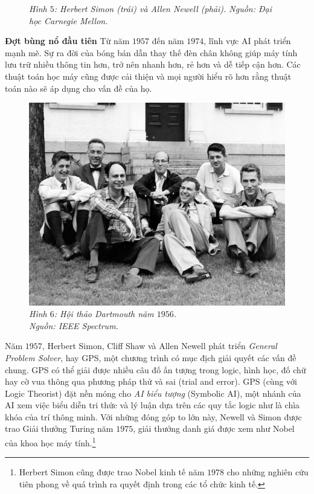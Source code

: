 \begin{multicols}{2}
\begin{figure}[H]
		\caption{\small\textit{\color{timhieukhoahoc}Hình $5$: Herbert Simon (trái) và Allen Newell (phải). Nguồn: Đại học Carnegie Mellon.}}
		\vspace*{-10pt}
	\end{figure}
	\textbf{\color{timhieukhoahoc}Đợt bùng nổ đầu tiên}
	\vskip 0.1cm
	Từ năm $1957$ đến năm $1974$, lĩnh vực AI phát triển mạnh mẽ. Sự ra đời của bóng bán dẫn thay thế đèn chân không giúp máy tính lưu trữ nhiều thông tin hơn, trở nên nhanh hơn, rẻ hơn và dễ tiếp cận hơn. Các thuật toán học máy cũng được cải thiện và mọi người hiểu rõ hơn rằng thuật toán nào sẽ áp dụng cho vấn đề của họ.
	\begin{figure}[H]
		\vspace*{5pt}
		\centering
		\captionsetup{labelformat= empty, justification=centering}
		\includegraphics[width= 1\linewidth]{Dartmouth.jpg}
		\caption{\small\textit{\color{timhieukhoahoc}Hình $6$: Hội thảo Dartmouth năm $1956$.\\ Nguồn: IEEE Spectrum.}}
		\vspace*{-10pt}
	\end{figure}
	Năm $1957$, Herbert Simon, Cliff Shaw và Allen Newell phát triển \textit{General Problem Solver}, hay GPS, một chương trình có mục địch giải quyết các vấn đề chung. GPS có thể giải được nhiều câu đố ấn tượng trong logic, hình học, đố chữ hay cờ vua thông qua phương pháp thử và sai (trial and error). GPS (cùng với Logic Theorist) đặt nền móng cho \textit{AI biểu tượng} (Symbolic AI), một nhánh của AI xem việc biểu diễn tri thức và lý luận dựa trên các quy tắc logic như là chìa khóa của trí thông minh. Với những đóng góp to lớn này, Newell và Simon được trao Giải thưởng Turing năm $1975$, giải thưởng danh giá được xem như Nobel của khoa học máy tính.\footnote{\color{timhieukhoahoc}Herbert Simon cũng được trao Nobel kinh tế năm $1978$ cho những nghiên cứu tiên phong về quá trình ra quyết định trong các tổ chức kinh tế.}

\end{multicols}
